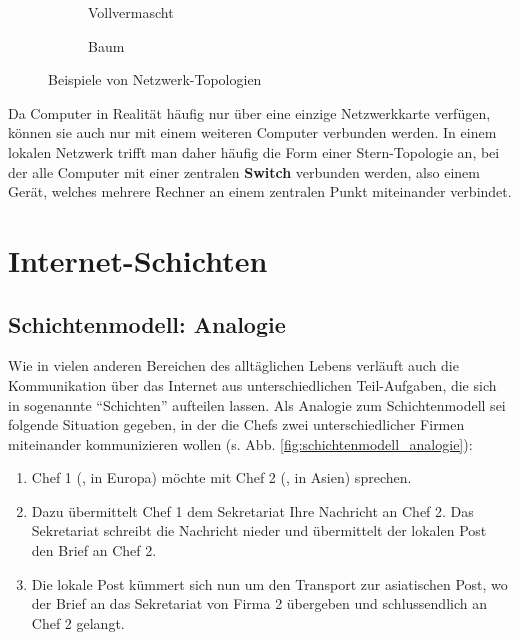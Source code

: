 \begin{figure}[H]
\begin{subfigure}[b]{0.25\textwidth}
  \caption{Vollvermascht}
\end{subfigure}
\begin{subfigure}{.25\textwidth}
\centering
{}
\caption{Baum}
\end{subfigure}
\caption{Beispiele von Netzwerk-Topologien}
\label{fig:topologie}
\end{figure}

Da Computer in Realität häufig nur über eine einzige Netzwerkkarte verfügen, können sie auch nur mit einem weiteren Computer verbunden werden. In einem lokalen Netzwerk trifft man daher häufig die Form einer Stern-Topologie an, bei der alle Computer mit einer zentralen \textbf{Switch} verbunden werden, also einem Gerät, welches mehrere Rechner an einem zentralen Punkt miteinander verbindet.


\section{Internet-Schichten}
\subsection{Schichtenmodell: Analogie}
Wie in vielen anderen Bereichen des alltäglichen Lebens verläuft auch die Kommunikation über das Internet aus unterschiedlichen Teil-Aufgaben, die sich in sogenannte ``Schichten'' aufteilen lassen. Als Analogie zum Schichtenmodell sei folgende Situation gegeben, in der die Chefs zwei unterschiedlicher Firmen miteinander kommunizieren wollen (s. Abb. \cref{fig:schichtenmodell_analogie}):
\begin{enumerate}
\item Chef 1 (\faFemale, in Europa) möchte mit Chef 2 (\faMale, in Asien) sprechen.
\item Dazu übermittelt Chef 1 dem Sekretariat Ihre Nachricht an Chef 2. Das Sekretariat schreibt die Nachricht nieder und übermittelt der lokalen Post den Brief an Chef 2.
\item Die lokale Post kümmert sich nun um den Transport zur asiatischen Post, wo der Brief an das Sekretariat von Firma 2 übergeben und schlussendlich an Chef 2 gelangt.
\end{enumerate}

